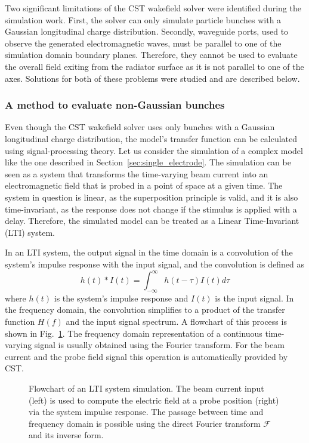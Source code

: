 Two significant limitations of the CST wakefield solver were identified during the simulation work. First, the solver can only simulate particle bunches with a Gaussian longitudinal charge distribution. Secondly, waveguide ports, used to observe the generated electromagnetic waves, must be parallel to one of the simulation domain boundary planes. Therefore, they cannot be used to evaluate the overall field exiting from the radiator surface as it is not parallel to one of the axes. Solutions for both of these problems were studied and are described below. 



\subsubsection{A method to evaluate non-Gaussian bunches}

Even though the CST wakefield solver uses only bunches with a Gaussian longitudinal charge distribution, the model's transfer function can be calculated using signal-processing theory. Let us consider the simulation of a complex model like the one described in Section~\ref{sec:single_electrode}. The simulation can be seen as a system that transforms the time-varying beam current into an electromagnetic field that is probed in a point of space at a given time. The system in question is linear, as the superposition principle is valid, and it is also time-invariant, as the response does not change if the stimulus is applied with a delay. Therefore, the simulated model can be treated as a Linear Time-Invariant (LTI) system. 

In an LTI system, the output signal in the time domain is a convolution of the system's impulse response with the input signal, and the convolution is defined as 
\begin{equation}
h(t)\ast I(t) = \int_{-\infty}^\infty  h(t-\tau) I(t) d\tau
\end{equation}
where $h(t)$ is the system's impulse response and $I(t)$ is the input signal. 
In the frequency domain, the convolution simplifies to a product of the transfer function $H(f)$ and the input signal spectrum. A flowchart of this process is shown in Fig.~\ref{fig:LTI_system}. The frequency domain representation of a continuous time-varying signal is usually obtained using the Fourier transform. For the beam current and the probe field signal this operation is automatically provided by CST.



\begin{figure}[!t]
\centering

\caption{Flowchart of an LTI system simulation. The beam current input (left) is used to compute the electric field at a probe position (right) via the system impulse response. The passage between time and frequency domain is possible using the direct Fourier transform $\mathcal{F}$ and its inverse form. }
\label{fig:LTI_system}
\end{figure}


